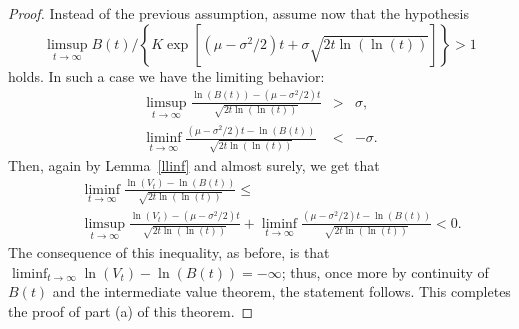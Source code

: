 \documentclass[12pt]{article}
\theoremstyle{definition}
\begin{document}
\begin{proof}
Instead of the previous assumption, assume now that the hypothesis
$$
\limsup_{t \to \infty} B(t) \Big/ \left\{ K \exp \left[(\mu-\sigma^2/2)t + \sigma \sqrt{2t \ln(\ln(t))}\right] \right\} >1
$$
holds. In such a case we have the limiting behavior:
\begin{eqnarray}\nonumber
\limsup_{t \to \infty} \frac{\ln(B(t))-(\mu - \sigma^2/2)t}{\sqrt{2t \ln(\ln(t))}} &>& \sigma,
\\ \nonumber
\liminf_{t \to \infty} \frac{(\mu - \sigma^2/2)t-\ln(B(t))}{\sqrt{2t \ln(\ln(t))}} &<& -\sigma.
\end{eqnarray}
Then, again by Lemma~\ref{llinf} and almost surely, we get that
\begin{eqnarray}\nonumber
&& \liminf_{t \to \infty} \frac{\ln(V_t)-\ln(B(t))}{\sqrt{2t \ln(\ln(t))}} \le \\ \nonumber
&& \limsup_{t \to \infty} \frac{\ln(V_t)-(\mu - \sigma^2/2)t}{\sqrt{2t \ln(\ln(t))}} + \liminf_{t \to \infty} \frac{(\mu - \sigma^2/2)t-\ln(B(t))}{\sqrt{2t \ln(\ln(t))}}<0.
\end{eqnarray}
The consequence of this inequality, as before, is that $\liminf_{t \to \infty} \ln(V_t)-\ln(B(t))=-\infty$; thus, once more by continuity of $B(t)$ and the intermediate value theorem, the statement follows. This completes the proof of part (a) of this theorem.


\end{proof}
\end{document}

